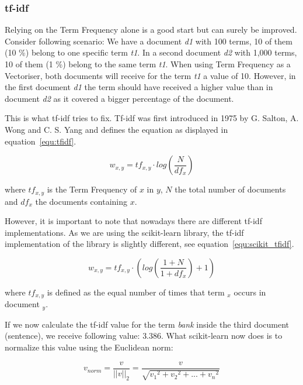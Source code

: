 \subsubsection{tf-idf}
Relying on the Term Frequency alone is a good start but can surely be improved.
Consider following scenario:
We have a document \textit{d1} with 100 terms, 10 of them (10 \%) belong to one specific term \textit{t1}.
In a second document \textit{d2} with 1,000 terms, 10 of them (1 \%) belong to the same term \textit{t1}.
When using Term Frequency as a Vectoriser, both documents will receive for the term \textit{t1} a value of 10.
However, in the first document \textit{d1} the term should have received a higher value
than in document \textit{d2} as it covered a bigger percentage of the document.

This is what tf-idf tries to fix.
Tf-idf was first introduced in 1975 by G. Salton, A. Wong and C. S. Yang \cite{salton1975}
and defines the equation as displayed in equation~\ref{equ:tfidf}.

\begin{equation}
    w_{x,y} = tf_{x,y} \cdot log(\frac{N}{df_x})
    \label{equ:tfidf}
\end{equation}

where $tf_{x,y}$ is the Term Frequency of $x$ in $y$, $N$ the total number of documents
and $df_x$ the documents containing $x$.

However, it is important to note that nowadays there are different tf-idf implementations.
As we are using the scikit-learn\cite{scikit-learn} library,
the tf-idf implementation\cite{scikit_tfidf} of the library is slightly different,
see equation~\ref{equ:scikit_tfidf}.

\begin{equation}
    w_{x,y} = tf_{x,y} \cdot (log(\frac{1+N}{1+df_x}) + 1)
    \label{equ:scikit_tfidf}
\end{equation}

where $tf_{x,y}$ is defined as the equal number of times that term ${_x}$ occurs in document ${_y}$.

If we now calculate the tf-idf value for the term \textit{bank} inside the third document (sentence),
we receive following value: $3.386$.
What scikit-learn now does is to normalize this value using the Euclidean norm:

\begin{equation}
    v_{norm} = \frac{v}{||v||_2} = \frac{v}{\sqrt{v_1{^2}+v_2{^2}+...+v_n{^2}}}
    \label{equ:euclidean}
\end{equation}

